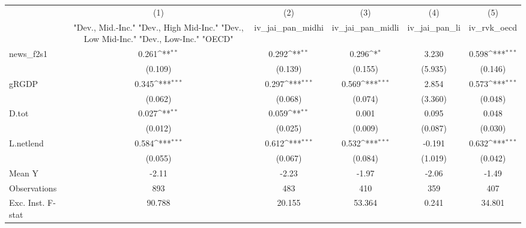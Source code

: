 {
\def\sym#1{\ifmmode^{#1}\else\(^{#1}\)\fi}
\begin{tabular}{l*{5}{c}}
\toprule
            &\multicolumn{1}{c}{(1)}&\multicolumn{1}{c}{(2)}&\multicolumn{1}{c}{(3)}&\multicolumn{1}{c}{(4)}&\multicolumn{1}{c}{(5)}\\
            &\multicolumn{1}{c}{ "Dev., Mid.-Inc." "Dev., High Mid-Inc." "Dev., Low Mid-Inc." "Dev., Low-Inc." "OECD" }&\multicolumn{1}{c}{iv\_jai\_pan\_midhi}&\multicolumn{1}{c}{iv\_jai\_pan\_midli}&\multicolumn{1}{c}{iv\_jai\_pan\_li}&\multicolumn{1}{c}{iv\_rvk\_oecd}\\
\midrule
news\_f2s1   &       0.261\sym{**} &       0.292\sym{**} &       0.296\sym{*}  &       3.230         &       0.598\sym{***}\\
            &     (0.109)         &     (0.139)         &     (0.155)         &     (5.935)         &     (0.146)         \\
\addlinespace
gRGDP       &       0.345\sym{***}&       0.297\sym{***}&       0.569\sym{***}&       2.854         &       0.573\sym{***}\\
            &     (0.062)         &     (0.068)         &     (0.074)         &     (3.360)         &     (0.048)         \\
\addlinespace
D.tot       &       0.027\sym{**} &       0.059\sym{**} &       0.001         &       0.095         &       0.048         \\
            &     (0.012)         &     (0.025)         &     (0.009)         &     (0.087)         &     (0.030)         \\
\addlinespace
L.netlend   &       0.584\sym{***}&       0.612\sym{***}&       0.532\sym{***}&      -0.191         &       0.632\sym{***}\\
            &     (0.055)         &     (0.067)         &     (0.084)         &     (1.019)         &     (0.042)         \\
\midrule
Mean Y      &       -2.11         &       -2.23         &       -1.97         &       -2.06         &       -1.49         \\
Observations&         893         &         483         &         410         &         359         &         407         \\
Exc. Inst. F-stat&      90.788         &      20.155         &      53.364         &       0.241         &      34.801         \\
\bottomrule
\end{tabular}
}
